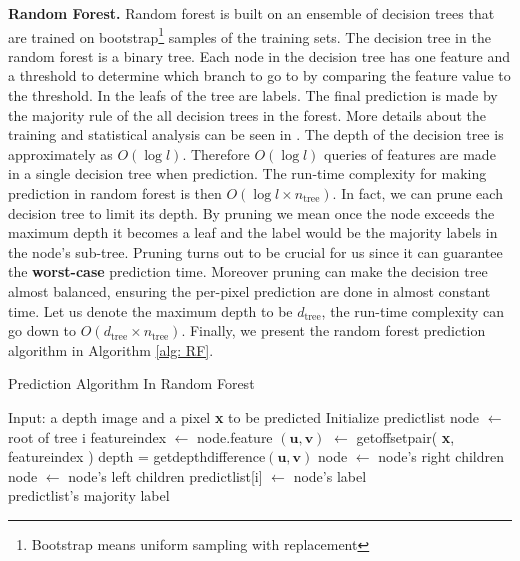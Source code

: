 \textbf{Random Forest.} Random forest is built on an ensemble of decision trees that are trained on  bootstrap\footnote{Bootstrap means uniform   sampling with replacement} samples of the training sets. The decision tree in the random forest is a binary tree. Each node in the decision tree has one feature and a threshold to determine which branch to go to by comparing the feature value to the threshold. In the leafs of the tree are labels. The final prediction is made by the majority rule of the all decision trees in the forest. More details about the training and statistical analysis can be seen in . The depth of the decision tree is approximately as $O(\log l)$. Therefore $O(\log l)$ queries of features are made in a single decision tree when prediction. The run-time complexity for making prediction in random forest is then $O(\log l \times n_{\text{tree}})$. In fact, we can prune each decision tree to limit its depth. By pruning we mean once the node exceeds the maximum depth it becomes a leaf and the label would be the majority labels in the node's sub-tree. Pruning turns out to be crucial for us since it can guarantee the \textbf{worst-case} prediction time. Moreover pruning can make the decision tree almost balanced, ensuring the per-pixel prediction are done in almost constant time. Let us denote the maximum depth to be  $d_{\text{tree}}$, the run-time complexity can go down to $O(d_{\text{tree}}\times n_{\text{tree}})$. Finally, we present the random forest prediction algorithm in Algorithm \ref{alg: RF}.

\begin{algorithm}
 \caption{Prediction Algorithm In Random Forest}
 \label{alg: RF}
\begin{algorithmic}

\State Input: a depth image and a pixel \textbf{x} to be predicted
\State Initialize predict\textunderscore list
     \State node $\leftarrow$ root of tree i
	   \State feature\textunderscore index $\gets$ node.feature
       \State $(\textbf{u}, \textbf{v})$ $\gets$ get\textunderscore offset\textunderscore pair( \textbf{x}, feature\textunderscore index )
	   \State depth = get\textunderscore depth\textunderscore difference$(\textbf{u}, \textbf{v})$
	      \State node $\gets$ node's right children	
	   \Else
	      \State node $\gets$ node's left children
       \EndIf
    \EndWhile
    \State predict\textunderscore list[i] $\gets$ node's label
  \EndFor
\\
\Return predict\textunderscore list's majority label
 
\end{algorithmic}
\end{algorithm}

